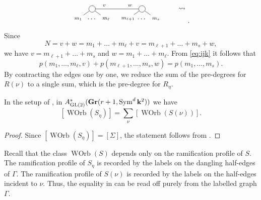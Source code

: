 \documentclass[11pt]{amsart}
\providecommand {\Gr}{{\bf Gr}}
\providecommand{\GL}{\operatorname{GL}}
\providecommand{\Sym}{\operatorname{Sym}}
\DeclareMathOperator{\WOrb}{WOrb}
\begin{document}
\begin{remark}
\[\begin{tikzpicture}
      \begin{scope}[xshift=-6.5cm]
        \draw (0,0) node[draw, circle] (A) {} ; 
        \draw (-0.7,-0.5) node (A1) {\scriptsize \(m_1\)} (0,-0.5) node (A2) {\dots} (0.7,-0.5) node (A3) {\scriptsize \(m_\ell\)};
        \draw (A) edge (A1) edge (A3);
      \end{scope}
      \begin{scope}[xshift=-4cm]
        \draw (0,0) node[draw, circle] (B) {} ; 
        \draw (-0.7,-0.5) node (B1) {\scriptsize \(m_{\ell+1}\)} (0,-0.5) node (B2) {\dots} (0.7,-0.5) node (B3) {\scriptsize \(m_s\)};
        \draw (B) edge (B1) edge (B3);
      \end{scope}
      \draw (A) edge
      node[above, pos=0.2] {\scriptsize \(v\)}
      node[above, pos=0.8] {\scriptsize \(w\)}
      (B);
      \begin{scope}[xshift=-2cm]
        \node {\(\leadsto\)};
      \end{scope}
    \end{tikzpicture}.
  \]
  Since
  \[N = v+w = m_1 + \dots + m_\ell + v = m_{\ell+1} + \dots + m_s + w, \]
  we have \(v = m_{\ell+1} + \dots + m_s\) and \(w = m_1 + \dots + m_{\ell}\).
  From \eqref{eq:ijk} it follows that
  \[ p(m_1, \dots, m_\ell, v) + p(m_{\ell+1}, \dots, m_s, w) = p(m_1,\dots, m_s).\]
  By contracting the edges one by one, we reduce the sum of the pre-degrees for \(R(\nu)\) to a single sum, which is the pre-degree for \(R_\eta\).
\end{remark}
\begin{corollary}\label{thm:spec0}
  In the setup of , in \(A^*_{\GL(2)}(\Gr(r+1,\Sym^d\k^2))\) we have
  \[ [\WOrb(S_\eta)] = \sum_\nu [\WOrb(S(\nu))].\]
\end{corollary}
\begin{proof}
  Since \([\WOrb(S_\eta)] = [\Sigma]\), the statement follows from .
\end{proof}

Recall that the class \(\WOrb(S)\) depends only on the ramification profile of \(S\).
The ramification profile of \(S_\eta\) is recorded by the labels on the dangling half-edges of \(\Gamma\).
The ramification profile of \(S(\nu)\) is recorded by the labels on the half-edges incident to \(\nu\).
Thus, the equality in  can be read off purely from the labelled graph \(\Gamma\).
\end{document}

